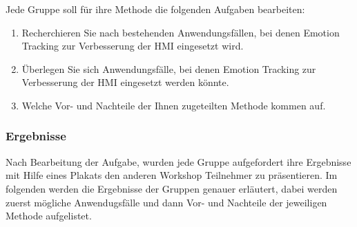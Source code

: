 Jede Gruppe soll für ihre Methode die folgenden Aufgaben bearbeiten:
\begin{enumerate}
	\item Recherchieren Sie nach bestehenden Anwendungsfällen, bei denen Emotion Tracking zur Verbesserung der \ac{HMI} eingesetzt wird.
	\item Überlegen Sie sich Anwendungsfälle, bei denen Emotion Tracking zur Verbesserung der \ac{HMI} eingesetzt werden könnte.
	\item Welche Vor- und Nachteile der Ihnen zugeteilten Methode kommen auf.
\end{enumerate}
\vspace{2mm}
\subsubsection*{Ergebnisse}\label{Umsetzung_Anwendungsfaelle_Ergebnisse}
Nach Bearbeitung der Aufgabe, wurden jede Gruppe aufgefordert ihre Ergebnisse mit Hilfe eines Plakats den anderen Workshop Teilnehmer zu präsentieren. Im folgenden werden die Ergebnisse der Gruppen genauer erläutert, dabei werden zuerst mögliche Anwendugsfälle und dann Vor- und Nachteile der jeweiligen Methode aufgelistet.\newline

